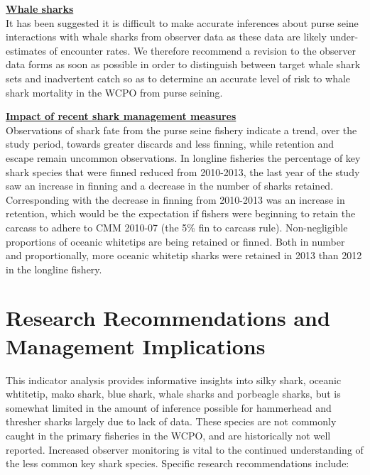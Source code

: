 \documentclass[12pt]{SCreport}
\begin{document}
\textbf{\underline{Whale sharks}}\\
It has been suggested it is difficult to make accurate inferences about purse seine interactions with whale sharks from observer data as these data are likely under-estimates of encounter rates.  We therefore recommend a revision to the observer data forms as soon as possible in order to distinguish between target whale shark sets and inadvertent catch so as to determine an accurate level of risk to whale shark mortality in the WCPO from purse seining.

%
%
\textbf{\underline{Impact of recent shark management measures}}\\
Observations of shark fate from the purse seine fishery indicate a trend, over the study period, towards  greater discards and less finning, while retention and escape remain  uncommon observations. In longline fisheries the percentage of key shark species that were finned reduced from 2010-2013, the last year of the study saw an increase in finning and a decrease in the number of sharks retained.  Corresponding with the decrease in finning from 2010-2013 was an increase in retention, which would be the expectation if fishers were beginning to retain the carcass to adhere to CMM 2010-07 (the 5\% fin to carcass rule).  Non-negligible proportions of oceanic whitetips are being retained or finned. Both in number and proportionally, more oceanic whitetip sharks were retained in 2013 than 2012 in the longline fishery. 



\section{Research Recommendations and Management Implications}

This indicator analysis provides informative insights into silky shark, oceanic whtitetip, mako shark, blue shark, whale sharks and porbeagle sharks, but is somewhat limited in the amount of inference possible for hammerhead and thresher sharks largely due to lack of data. These species are not commonly caught in the primary fisheries in the WCPO, and are historically not well reported. Increased observer monitoring is vital to the continued understanding of the less common key shark species. Specific research recommendations include: 
 
\end{document}

